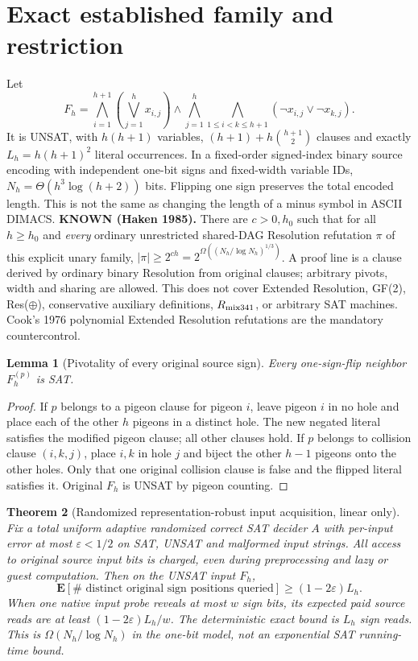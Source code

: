 \documentclass[11pt]{article}
\newtheorem{theorem}{Theorem}
\newtheorem{lemma}[theorem]{Lemma}
\begin{document}
\section*{Exact established family and restriction}
Let
\[
F_h=\bigwedge_{i=1}^{h+1}\left(\bigvee_{j=1}^h x_{i,j}\right)
\wedge\bigwedge_{j=1}^{h}\bigwedge_{1\le i<k\le h+1}
(\neg x_{i,j}\vee\neg x_{k,j}).
\]
It is UNSAT, with $h(h+1)$ variables, $(h+1)+h{h+1\choose2}$ clauses and exactly $L_h=h(h+1)^2$ literal occurrences. In a fixed-order signed-index binary source encoding with independent one-bit signs and fixed-width variable IDs, $N_h=\Theta(h^3\log(h+2))$ bits. Flipping one sign preserves the total encoded length. This is not the same as changing the length of a minus symbol in ASCII DIMACS.
\noindent\textbf{KNOWN (Haken 1985).} There are $c>0,h_0$ such that for all $h\ge h_0$ and \emph{every} ordinary unrestricted shared-DAG Resolution refutation $\pi$ of this explicit unary family, $|\pi|\ge2^{ch}=2^{\Omega((N_h/\log N_h)^{1/3})}$. A proof line is a clause derived by ordinary binary Resolution from original clauses; arbitrary pivots, width and sharing are allowed. This does not cover Extended Resolution, GF(2), Res($\oplus$), conservative auxiliary definitions, $R_{\rm mix341}$, or arbitrary SAT machines. Cook's 1976 polynomial Extended Resolution refutations are the mandatory countercontrol.
\begin{lemma}[Pivotality of every original source sign]
Every one-sign-flip neighbor $F_h^{(p)}$ is SAT.
\end{lemma}
\begin{proof}
If $p$ belongs to a pigeon clause for pigeon $i$, leave pigeon $i$ in no hole and place each of the other $h$ pigeons in a distinct hole. The new negated literal satisfies the modified pigeon clause; all other clauses hold. If $p$ belongs to collision clause $(i,k,j)$, place $i,k$ in hole $j$ and biject the other $h-1$ pigeons onto the other holes. Only that one original collision clause is false and the flipped literal satisfies it. Original $F_h$ is UNSAT by pigeon counting.
\end{proof}
\begin{theorem}[Randomized representation-robust input acquisition, linear only]
Fix a total uniform adaptive randomized correct SAT decider $A$ with per-input error at most $\varepsilon<1/2$ on SAT, UNSAT and malformed input strings. All access to original source input bits is charged, even during preprocessing and lazy or guest computation. Then on the UNSAT input $F_h$,
\[
\mathbf E[\#\text{ distinct original sign positions queried}]\ge (1-2\varepsilon)L_h.
\]
When one native input probe reveals at most $w$ sign bits, its expected paid source reads are at least $(1-2\varepsilon)L_h/w$. The deterministic exact bound is $L_h$ sign reads. This is $\Omega(N_h/\log N_h)$ in the one-bit model, not an exponential SAT running-time bound.
\end{theorem}
\end{document}
